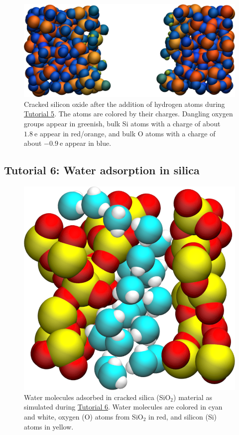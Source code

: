 \documentclass[9pt,tutorial]{livecoms}
\begin{document}
\begin{figure}
\includegraphics[width=\linewidth]{SIO-decorated}
\caption{Cracked silicon oxide after the addition of hydrogen atoms
during \hyperref[reactive-silicon-dioxide-label]{Tutorial 5}.  The atoms
are colored by their charges.  Dangling oxygen groups appear in greenish, bulk
Si atoms with a charge of about $1.8~\text{e}$ appear in red/orange, and bulk
O atoms with a charge of about $-0.9 ~ \text{e}$ appear in blue.}
\label{fig:SIO-decorated}
\end{figure}

\subsection{Tutorial 6: Water adsorption in silica}
\label{gcmc-silica-label}

\begin{figure}
\centering
\includegraphics[width=0.55\linewidth]{GCMC}
\caption{Water molecules adsorbed in cracked silica (SiO$_2$) material as simulated
during \hyperref[gcmc-silica-label]{Tutorial 6}.  Water molecules are colored in
cyan and white, oxygen (O) atoms from SiO$_2$ in red, and silicon (Si) atoms in yellow.}
\label{fig:GCMC}
\end{figure}
\end{document}
